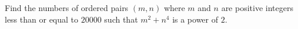 Find the numbers of ordered pairs $(m, n)$ where $m$ and $n$ are positive integers less than or equal to $20000$ such that $m^2 + n^4$ is a power of $2$.
